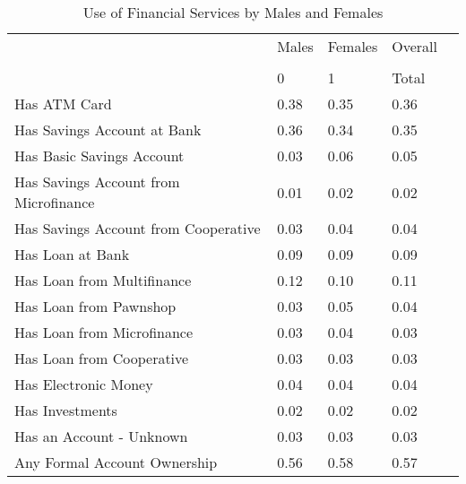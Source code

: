 \begin{table}[H] \begin{adjustbox}{max width=\textwidth} \begin{threeparttable} \caption{Use of Financial Services by Males and Females} \label{servgender} {\begin{tabular}{l*{1}{llll}} \hline  & Males & Females & Overall \\
                                                                                &\multicolumn{3}{c}{}         \\
                                                                                &        0&        1&    Total\\
\hline
Has ATM Card                                                                    &     0.38&     0.35&     0.36\\
Has Savings Account at Bank                                                     &     0.36&     0.34&     0.35\\
Has Basic Savings Account                                                       &     0.03&     0.06&     0.05\\
Has Savings Account from Microfinance                                           &     0.01&     0.02&     0.02\\
Has Savings Account from Cooperative                                            &     0.03&     0.04&     0.04\\
Has Loan at Bank                                                                &     0.09&     0.09&     0.09\\
Has Loan from Multifinance                                                      &     0.12&     0.10&     0.11\\
Has Loan from Pawnshop                                                          &     0.03&     0.05&     0.04\\
Has Loan from Microfinance                                                      &     0.03&     0.04&     0.03\\
Has Loan from Cooperative                                                       &     0.03&     0.03&     0.03\\
Has Electronic Money                                                            &     0.04&     0.04&     0.04\\
Has Investments                                                                 &     0.02&     0.02&     0.02\\
Has an Account - Unknown                                                        &     0.03&     0.03&     0.03\\
Any Formal Account Ownership                                                    &     0.56&     0.58&     0.57\\
\hline
\end{tabular}} \end{threeparttable} \end{adjustbox} \end{table} \vspace*{-5mm}
